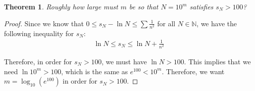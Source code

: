 \documentclass[psamsfonts]{amsart}
\newtheorem{thm}{Theorem}[section]
\theoremstyle{definition}
\theoremstyle{remark}
\numberwithin{equation}{section}
\begin{document}
\begin{thm}
Roughly how large must $m$ be so that $N = 10^m$ satisfies $s_N > 100$? 
\end{thm}

\begin{proof}
Since we know that $0 \leq s_N - \ln N \leq \sum \frac{1}{n^2}$ for all $N \in \mathbb{N}$, we have the following inequality for $s_N$:
\begin{eqnarray}
\ln N \leq s_N \leq \ln N + \frac{1}{n^2}
\end{eqnarray}

Therefore, in order for $s_N > 100$, we must have $\ln N > 100$. This implies that we need $\ln 10^m > 100$, which is the same as $e^{100} < 10^m$. Therefore, we want $m = \log_{10}( e^{100})$ in order for $s_N > 100$. 
\end{proof}
\end{document}
